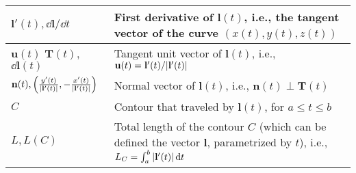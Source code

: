 \documentclass{article}
\begin{document}
\begin{xltabular}{\textwidth}{XX}
	\(\mathbf{l}'(t), \dd{\mathbf{l}}/\dd{t}\)                                                                                                                                                                                                 & First derivative of \(\mathbf{l}(t)\), i.e., the tangent vector of the curve \((x(t), y(t), z(t))\) \cite{stewartCalculus2011}                                                                                                                                                                                                      \\ \hline
	\(\mathbf{u}(t)\)\cite{kreyszigAdvancedEngineeringMathematics2008} \(\mathbf{T}(t)\)\cite{stewartCalculus2011}, \(\dd{\mathbf{l}}(t)\)\cite{ramoFieldsWavesCommunication1994}                                                                   & Tangent unit vector of \(\mathbf{l}(t)\), i.e., \newline  \(\mathbf{u}(t) = \mathbf{l}'(t)/\abs{\mathbf{l}'(t)}\) \\ \hline
	\(\mathbf{n}(t), \left( \frac{y'(t)}{\abs{\mathbf{l}'(t)}}, -\frac{x'(t)}{\abs{\mathbf{l}'(t)}} \right)\)                                                                                                                                  & Normal vector of \(\mathbf{l}(t)\), i.e., \newline \(\mathbf{n}(t)\perp \mathbf{T}(t) \)\cite{stewartCalculus2011}                                                                                                                                                                                                                  \\ \hline
	\(C\)                                                                                                                                                                                                                                      & Contour that traveled by \(\mathbf{l}(t)\), for \(a \leq t \leq b\) \cite{stewartCalculus2011}                                                                                                                                                                                                                                      \\ \hline
	\(L, L(C)\)                                                                                                                                                                                                                                & Total length of the contour \(C\) (which can be defined the vector \(\mathbf{l}\), parametrized by \(t\)), i.e., \(L_C = \int_a^b \abs{\mathbf{l}'(t)} \dd{t}\)\cite{stewartCalculus2011}                                                                                                                                           \\ \hline

\end{xltabular}
\end{document}
